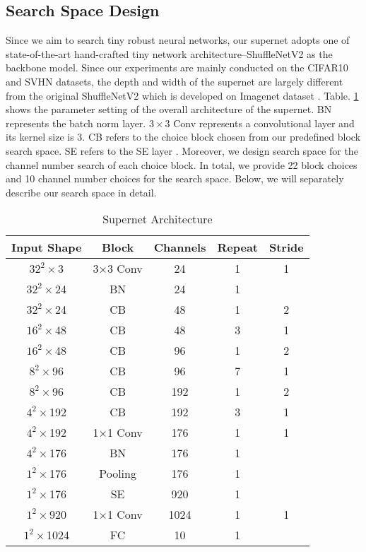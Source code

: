 \documentclass[journal]{IEEEtran}
\newcommand{\revised}[1]{{\color{black} #1}}
\begin{document}
\subsection{\textbf{Search Space Design}}
Since we aim to search tiny robust neural networks, our supernet \revised{adopts} one of state-of-the-art hand-crafted tiny network architecture--ShuffleNetV2 \cite{ma2018shufflenet} as the backbone model. Since our experiments are mainly conducted on the CIFAR10 \cite{krizhevsky2009learning} and SVHN \cite{netzer2011reading} datasets, the depth and width of the supernet are largely different from the original ShuffleNetV2 which is developed on Imagenet dataset \cite{ILSVRC15}. Table. \ref{tab:supernet_architecture} shows the parameter setting of the overall architecture of the supernet. BN represents the batch norm layer. $3\times3$ Conv represents a convolutional layer and its kernel size is 3. CB refers to the choice block chosen from our predefined block search space. SE refers to the SE layer \cite{hu2018squeeze}. Moreover, we design search space for the channel number search of each choice block. In total, we provide 22 block choices and 10 channel number choices for the search space. Below, we will separately describe our search space in detail. 
\begin{table}[ht]
    \centering
    \caption{Supernet Architecture}
    \begin{tabular}{c|c|c|c|c}
        \hline
        Input Shape & Block & Channels & Repeat & Stride  \\
        \hline
        $32^{2}\times$3 & 3$\times$3 Conv & 24 & 1 & 1 \\
        \hline
        $32^{2}\times$24 & BN & 24 & 1 &  \\
        \hline
        $32^{2}\times$24 & CB & 48 & 1 & 2 \\
        \hline
        $16^{2}\times$48 & CB & 48 & 3 & 1 \\
        \hline
        ${16}^{2}\times$48 & CB & 96 & 1 & 2 \\
        \hline
        ${8}^{2}\times$96 & CB & 96 & 7 & 1 \\
        \hline
        ${8}^{2}\times$96 & CB & 192 & 1 & 2 \\
        \hline
        ${4}^{2}\times$192 & CB & 192 & 3 & 1 \\
        \hline
        ${4}^{2}\times$192 & 1$\times$1 Conv & 176 & 1 & 1 \\
        \hline
        ${4}^{2}\times$176 & BN & 176 & 1 \\
        \hline
        ${1}^{2}\times$176 & Pooling & 176 & 1 \\
        \hline
        ${1}^{2}\times$176 & SE & 920 & 1 \\
        \hline
        ${1}^{2}\times$920 & 1$\times$1 Conv & 1024 & 1 & 1 \\
        \hline
        ${1}^{2}\times$1024 & FC & 10 & 1 \\
        \hline
    \end{tabular}
    \label{tab:supernet_architecture}
\end{table}
\end{document}
